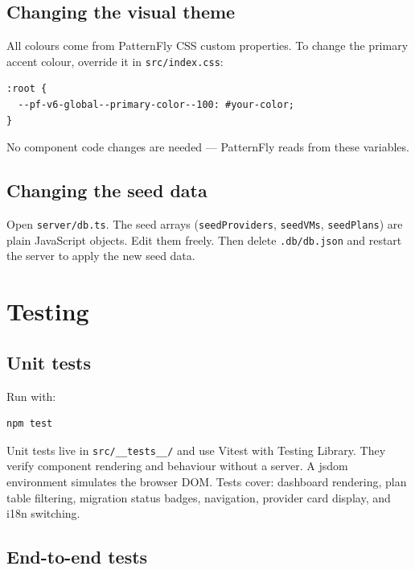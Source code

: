 \documentclass[12pt,a4paper]{article}
\begin{document}
\subsection{Changing the visual theme}

All colours come from PatternFly CSS custom properties. To change the primary accent colour, override it in \texttt{src/index.css}:

\begin{lstlisting}[language={}]
:root {
  --pf-v6-global--primary-color--100: #your-color;
}
\end{lstlisting}

No component code changes are needed — PatternFly reads from these variables.

\subsection{Changing the seed data}

Open \texttt{server/db.ts}. The seed arrays (\texttt{seedProviders}, \texttt{seedVMs}, \texttt{seedPlans}) are plain JavaScript objects. Edit them freely. Then delete \texttt{.db/db.json} and restart the server to apply the new seed data.

\section{Testing}
\label{sec:testing}

\subsection{Unit tests}

Run with:
\begin{lstlisting}
npm test
\end{lstlisting}

Unit tests live in \texttt{src/\_\_tests\_\_/} and use Vitest with Testing Library. They verify component rendering and behaviour without a server. A jsdom environment simulates the browser DOM. Tests cover: dashboard rendering, plan table filtering, migration status badges, navigation, provider card display, and i18n switching.

\subsection{End-to-end tests}
\end{document}
